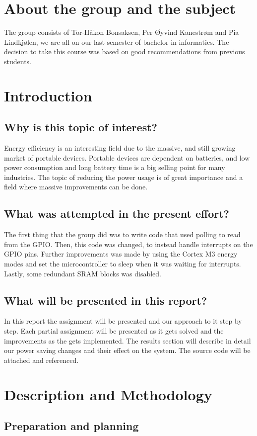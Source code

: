 \section{About the group and the subject}
The group consists of Tor-Håkon Bonsaksen, Per Øyvind Kanestrøm and Pia Lindkjølen, we are all on our last semester of bachelor in informatics. The decision to take this course was based on good recommendations from previous students. 

\section{Introduction}
\subsection{Why is this topic of interest?}
Energy efficiency is an interesting field due to the massive, and still growing market of portable devices. Portable devices are dependent on batteries, and low power consumption and long battery time is a big selling point for many industries. The topic of reducing the power usage is of great importance and a field where massive improvements can be done. 
\subsection{What was attempted in the present effort?}
The first thing that the group did was to write code that used polling to read from the GPIO. Then, this code was changed, to instead handle interrupts on the GPIO pins. Further improvements was made by using the Cortex M3 energy modes and set the microcontroller to sleep when it was waiting for interrupts. Lastly, some redundant SRAM blocks was disabled.   
\subsection{What will be presented in this report?}
In this report the assignment will be presented and our approach to it step by step. Each partial assignment will be presented as it gets solved and the improvements as the gets implemented. The results section will describe in detail our power saving changes and their effect on the system.
The source code will be attached and referenced.

\section{Description and Methodology}
\subsection{Preparation and planning}

